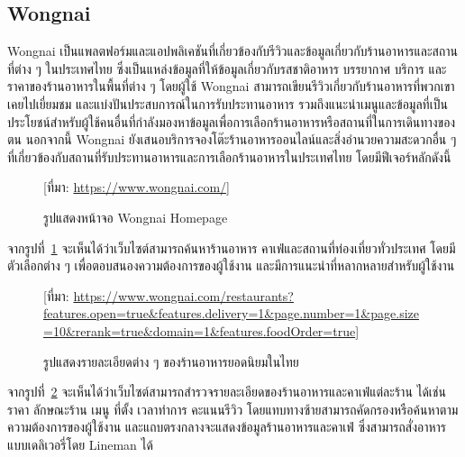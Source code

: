 \documentclass[12pt,oneside,openright,a4paper]{cpe-thai-project}
\begin{document}
\subsection{Wongnai}
Wongnai \cite{wongnai} เป็นแพลตฟอร์มและแอปพลิเคชันที่เกี่ยวข้องกับรีวิวและข้อมูลเกี่ยวกับร้านอาหารและสถานที่ต่าง ๆ ในประเทศไทย ซึ่งเป็นแหล่งข้อมูลที่ให้ข้อมูลเกี่ยวกับรสชาติอาหาร บรรยากาศ บริการ และราคาของร้านอาหารในพื้นที่ต่าง ๆ โดยผู้ใช้ Wongnai สามารถเขียนรีวิวเกี่ยวกับร้านอาหารที่พวกเขาเคยไปเยี่ยมชม และแบ่งปันประสบการณ์ในการรับประทานอาหาร รวมถึงแนะนำเมนูและข้อมูลที่เป็นประโยชน์สำหรับผู้ใช้คนอื่นที่กำลังมองหาข้อมูลเพื่อการเลือกร้านอาหารหรือสถานที่ในการเดินทางของตน นอกจากนี้ Wongnai ยังเสนอบริการจองโต๊ะร้านอาหารออนไลน์และสิ่งอำนวยความสะดวกอื่น ๆ ที่เกี่ยวข้องกับสถานที่รับประทานอาหารและการเลือกร้านอาหารในประเทศไทย โดยมีฟีเจอร์หลักดังนี้

\begin{figure}[!h]\centering
\setlength{\fboxrule}{0.1mm}
\caption{รูปแสดงหน้าจอ Wongnai Homepage}\label{fig:F2.5}
[ที่มา: \href{https://www.wongnai.com/} {https://www.wongnai.com/}]
\end{figure}
จากรูปที่~\ref{fig:F2.5} จะเห็นได้ว่าเว็บไซต์สามารถค้นหาร้านอาหาร คาเฟ่และสถานที่ท่องเที่ยวทั่วประเทศ โดยมีตัวเลือกต่าง ๆ เพื่อตอบสนองความต้องการของผู้ใช้งาน และมีการแนะนำที่หลากหลายสำหรับผู้ใช้งาน \newpage

\begin{figure}[!h]\centering
\setlength{\fboxrule}{0.1mm}
\caption{รูปแสดงรายละเอียดต่าง ๆ ของร้านอาหารยอดนิยมในไทย}\label{fig:F2.6}
[ที่มา: \href{https://www.wongnai.com/restaurants?features.open=true\&features.delivery=1\&page.number=1\&page.size=10\&rerank=true\&domain=1\&features.foodOrder=true} {https://www.wongnai.com/restaurants?features.open=true\&features.delivery=1\&page.number=1\&page.size=10\&rerank=true\&domain=1\&features.foodOrder=true}]
\end{figure}
จากรูปที่~\ref{fig:F2.6} จะเห็นได้ว่าเว็บไซต์สามารถสำรวจรายละเอียดของร้านอาหารและคาเฟ่แต่ละร้าน ได้เช่น ราคา ลักษณะร้าน เมนู ที่ตั้ง เวลาทำการ คะแนนรีวิว โดยแทบทางซ้ายสามารถคัดกรองหรือค้นหาตามความต้องการของผู้ใช้งาน และแถบตรงกลางจะแสดงข้อมูลร้านอาหารและคาเฟ่ ซึ่งสามารถสั่งอาหารแบบเดลิเวอรี่โดย Lineman ได้ \\

\end{document}
